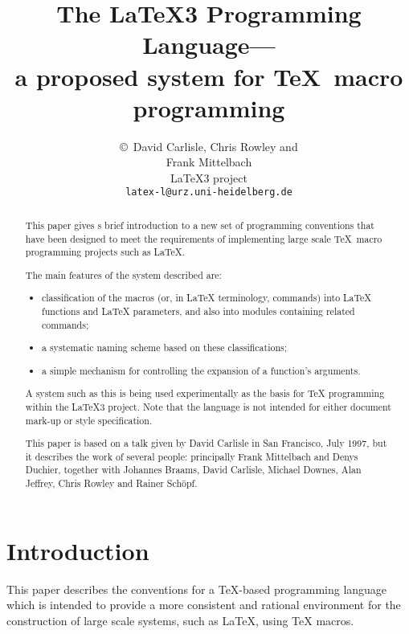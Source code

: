 \documentclass{article}
\begin{document}
\title{The \LaTeX3 Programming Language---\\
a proposed system for \TeX\ macro programming}


\author{\copyright~David Carlisle,  Chris Rowley and\\ Frank Mittelbach\\
\LaTeX3 project\\
\texttt{latex-l@urz.uni-heidelberg.de}}


\maketitle

\begin{abstract}

This paper gives s brief introduction to a new set of programming
conventions that have been designed to meet the requirements of
implementing large scale \TeX\ macro programming projects such as
\LaTeX.

The main features of the system described are:
\begin{itemize}
\item classification of the macros (or, in \LaTeX{} terminology,
  commands) into \LaTeX{} functions and \LaTeX{} parameters, and also
  into modules containing related commands;
\item  a systematic naming scheme based on these
  classifications;
\item  a simple mechanism for controlling the expansion of a function's
arguments.
\end{itemize}
A system such as this is being used experimentally as the basis for
\TeX{} programming within the \LaTeX3 project.
Note that the language is not intended for either
document mark-up or style specification.

This paper is based on a talk given by David Carlisle in San
Francisco, July 1997, but it describes the work of several people:
principally
  Frank Mittelbach and
  Denys Duchier,
together with
  Johannes Braams,
  David Carlisle,
  Michael Downes,
  Alan Jeffrey,
  Chris Rowley and
  Rainer Sch\"opf.
\end{abstract}

\vspace{4pt}


\section{Introduction}

This paper describes the conventions for a \TeX-based programming
language which is intended to provide a more consistent and rational
environment for the construction of large scale systems, such as
\LaTeX, using \TeX{} macros.
\end{document}
